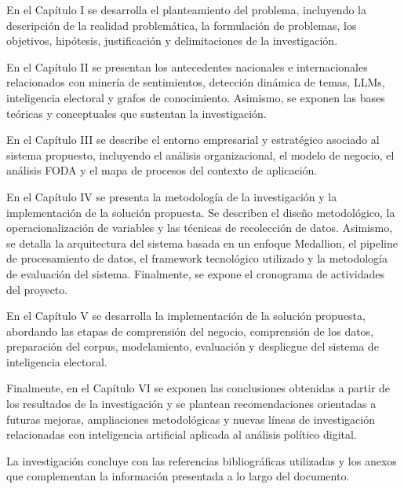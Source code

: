 En el Capítulo I se desarrolla el planteamiento del problema, incluyendo la descripción de la realidad problemática, la formulación de problemas, los objetivos, hipótesis, justificación y delimitaciones de la investigación.

En el Capítulo II se presentan los antecedentes nacionales e internacionales relacionados con minería de sentimientos, detección dinámica de temas, LLMs, inteligencia electoral y grafos de conocimiento. Asimismo, se exponen las bases teóricas y conceptuales que sustentan la investigación.

En el Capítulo III se describe el entorno empresarial y estratégico asociado al sistema propuesto, incluyendo el análisis organizacional, el modelo de negocio, el análisis FODA y el mapa de procesos del contexto de aplicación.

En el Capítulo IV se presenta la metodología de la investigación y la implementación de la solución propuesta. Se describen el diseño metodológico, la operacionalización de variables y las técnicas de recolección de datos. Asimismo, se detalla la arquitectura del sistema basada en un enfoque Medallion, el pipeline de procesamiento de datos, el framework tecnológico utilizado y la metodología de evaluación del sistema. Finalmente, se expone el cronograma de actividades del proyecto.

En el Capítulo V se desarrolla la implementación de la solución propuesta, abordando las etapas de comprensión del negocio, comprensión de los datos, preparación del corpus, modelamiento, evaluación y despliegue del sistema de inteligencia electoral.

Finalmente, en el Capítulo VI se exponen las conclusiones obtenidas a partir de los resultados de la investigación y se plantean recomendaciones orientadas a futuras mejoras, ampliaciones metodológicas y nuevas líneas de investigación relacionadas con inteligencia artificial aplicada al análisis político digital.

La investigación concluye con las referencias bibliográficas utilizadas y los anexos que complementan la información presentada a lo largo del documento.
